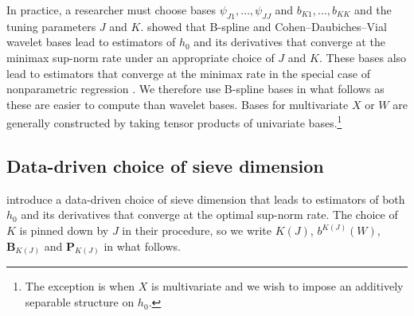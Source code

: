 \documentclass[
]{jss}
\begin{document}
In practice, a researcher must choose bases
\(\psi_{J1},\ldots,\psi_{JJ}\) and \(b_{K1},\ldots,b_{KK}\) and the
tuning parameters \(J\) and \(K\). \citet{CCQE} showed that B-spline and
Cohen--Daubiches--Vial wavelet bases lead to estimators of \(h_0\) and
its derivatives that converge at the minimax sup-norm rate under an
appropriate choice of \(J\) and \(K\). These bases also lead to
estimators that converge at the minimax rate in the special case of
nonparametric regression \citep{BCCK, CC15Reg}. We therefore use
B-spline bases in what follows as these are easier to compute than
wavelet bases. Bases for multivariate \(X\) or \(W\) are generally
constructed by taking tensor products of univariate bases.\footnote{The
  exception is when \(X\) is multivariate and we wish to impose an
  additively separable structure on \(h_0\).}

\subsection{Data-driven choice of sieve
dimension}\label{data-driven-choice-of-sieve-dimension}

\citet{CCK} introduce a data-driven choice of sieve dimension that leads
to estimators of both \(h_0\) and its derivatives that converge at the
optimal sup-norm rate. The choice of \(K\) is pinned down by \(J\) in
their procedure, so we write \(K(J)\), \(b^{K(J)}(W)\),
\(\mathbf B_{K(J)}\) and \(\mathbf P_{K(J)}\) in what follows.
\end{document}
